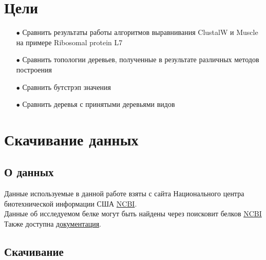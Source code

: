 \section{Цели}
\begin{enumerate}
\item[$\bullet$] Сравнить результаты работы алгоритмов выравнивания ClustalW и Muscle на примере Ribosomal protein L7
\item[$\bullet$] Сравнить топологии деревьев, полученные в результате различных методов построения
\item[$\bullet$] Сравнить бутстрэп значения
\item[$\bullet$] Сравнить деревья с принятыми деревьями видов
\end{enumerate}


\section{Скачивание данных}
\subsection*{О данных}
Данные используемые в данной работе взяты с сайта Национального центра биотехнической информации США \href{https://www.ncbi.nlm.nih.gov/}{NCBI}.\\
Данные об исследуемом белке могут быть найдены через поисковит белков \href{https://www.ncbi.nlm.nih.gov/protein/}{NCBI}\\
Также доступна \href{https://www.ncbi.nlm.nih.gov/guide/proteins/#howtos}{документация}.\\

\subsection*{Скачивание}


